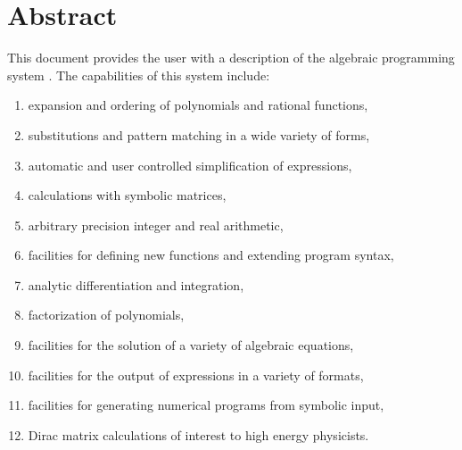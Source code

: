 \chapter*{Abstract}


This document provides the user with a description of the algebraic
programming system {\REDUCE}.  The capabilities of this system include:
\begin{enumerate}
\item expansion and ordering of polynomials and rational functions,
\item substitutions and pattern matching in a wide variety of forms,
\item automatic and user controlled simplification of expressions,
\item calculations with symbolic matrices,
\item arbitrary precision integer and real arithmetic,
\item facilities for defining new functions and extending program syntax,
\item analytic differentiation and integration,
\item factorization of polynomials,
\item facilities for the solution of a variety of algebraic equations,
\item facilities for the output of expressions in a variety of formats,
\item facilities for generating numerical programs from symbolic input,
\item Dirac matrix calculations of interest to high energy physicists.
\end{enumerate}

